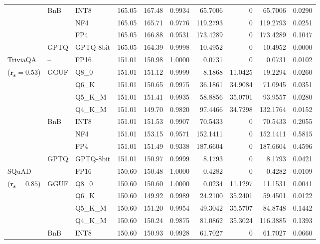 \begin{longtable}{ll l rrrrrrr}
 & BnB & INT8 & 165.05 & 167.48 & 0.9934 & 65.7006 & \cellcolor{cyan!12} $0$ & 65.7006 & 0.0290 \\
 &  & NF4 & 165.05 & 165.71 & 0.9776 & 119.2793 & \cellcolor{cyan!12} $0$ & 119.2793 & 0.0251 \\
 &  & FP4 & 165.05 & 166.88 & 0.9531 & 173.4289 & \cellcolor{cyan!12} $0$ & 173.4289 & 0.1047 \\
 & GPTQ & GPTQ-8bit & 165.05 & 164.39 & 0.9998 & 10.4952 & \cellcolor{cyan!12} $0$ & 10.4952 & 0.0000 \\
\midrule
TriviaQA & -- & FP16 & 151.01 & 150.98 & 1.0000 & 0.0731 & \cellcolor{cyan!12} $0$ & 0.0731 & 0.0102 \\
{\small ($\mathbf{r_s{=}0.53}$)} & GGUF & Q8\_0 & 151.01 & 151.12 & 0.9999 & 8.1868 & 11.0425 & 19.2294 & 0.0260 \\
 &  & Q6\_K & 151.01 & 150.65 & 0.9975 & 36.1861 & 34.9084 & 71.0945 & 0.0351 \\
 &  & Q5\_K\_M & 151.01 & 151.41 & 0.9935 & 58.8856 & 35.0701 & 93.9557 & 0.0280 \\
 &  & Q4\_K\_M & 151.01 & 149.70 & 0.9820 & 97.4466 & 34.7298 & 132.1764 & 0.0152 \\
 & BnB & INT8 & 151.01 & 151.53 & 0.9907 & 70.5433 & \cellcolor{cyan!12} $0$ & 70.5433 & 0.2055 \\
 &  & NF4 & 151.01 & 153.15 & 0.9571 & 152.1411 & \cellcolor{cyan!12} $0$ & 152.1411 & 0.5815 \\
 &  & FP4 & 151.01 & 151.49 & \cellcolor{red!18} 0.9338 & \cellcolor{red!18} 187.6604 & \cellcolor{cyan!12} $0$ & \cellcolor{red!18} 187.6604 & \cellcolor{red!18} 0.4596 \\
 & GPTQ & GPTQ-8bit & 151.01 & 150.97 & 0.9999 & 8.1793 & \cellcolor{cyan!12} $0$ & 8.1793 & 0.0421 \\
\midrule
SQuAD & -- & FP16 & 150.60 & 150.48 & 1.0000 & 0.4282 & \cellcolor{cyan!12} $0$ & 0.4282 & 0.0109 \\
{\small ($\mathbf{r_s{=}0.85}$)} & GGUF & Q8\_0 & 150.60 & 150.60 & 1.0000 & 0.0234 & 11.1297 & 11.1531 & 0.0041 \\
 &  & Q6\_K & 150.60 & 149.92 & 0.9989 & 24.2100 & 35.2401 & 59.4501 & 0.0122 \\
 &  & Q5\_K\_M & 150.60 & 151.20 & 0.9954 & 49.3042 & 35.5707 & 84.8748 & 0.1442 \\
 &  & Q4\_K\_M & 150.60 & 150.24 & 0.9875 & 81.0862 & 35.3024 & 116.3885 & 0.1393 \\
 & BnB & INT8 & 150.60 & 150.93 & 0.9928 & 61.7027 & \cellcolor{cyan!12} $0$ & 61.7027 & 0.0660 \\

\end{longtable}
